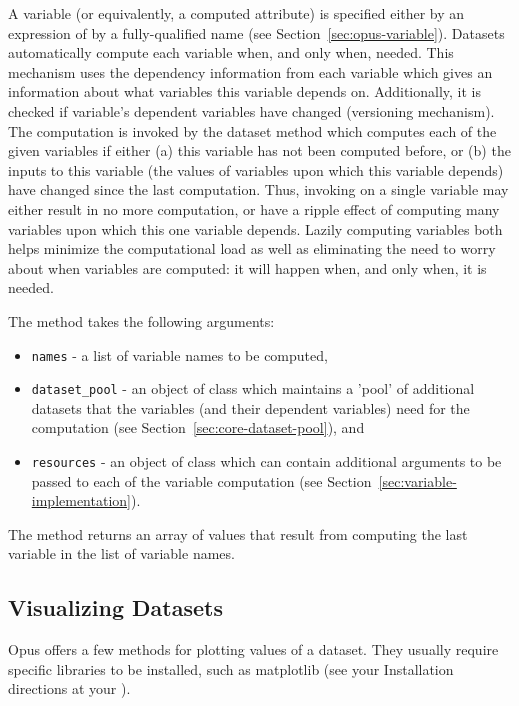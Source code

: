 A variable (or equivalently, a computed attribute) is specified either by an expression of by a 
fully-qualified name (see Section~\ref{sec:opus-variable}).
Datasets automatically compute each variable when, and only when,
needed.  This mechanism uses the dependency information
from each variable which gives an information about what variables this
variable depends on. Additionally, it is checked if variable's dependent
variables have changed (versioning mechanism).  The computation is invoked by
the dataset method  which computes each of the
given variables if either (a) this variable has not been computed before, or
(b) the inputs to this variable (the values of variables upon which this
variable depends) have changed since the last computation.  Thus, invoking
 on a single variable may either result in no more
computation, or have a ripple effect of computing many variables upon which
this one variable depends.  Lazily computing variables both helps minimize the
computational load as well as eliminating the need to worry about when
variables are computed: it will happen when, and only when, it is needed.

The method  takes the following arguments:
\begin{itemize}
\item \verb|names| - a list of
variable names to be computed,
\item \verb|dataset_pool| - an object of class  which
maintains a 'pool' of additional datasets that the variables (and their dependent
variables) need for the computation (see Section~\ref{sec:core-dataset-pool}), and
\item \verb|resources| - an object of class  which can contain additional arguments 
to be passed to each of the variable computation (see Section~\ref{sec:variable-implementation}).
\end{itemize}
The method returns an array of values that result from computing the last variable in the 
list of variable names.

\subsection{Visualizing Datasets}
%
Opus offers a few methods for plotting values of a dataset. They usually
require specific libraries to be installed, such as matplotlib (see your
Installation directions at your ).

